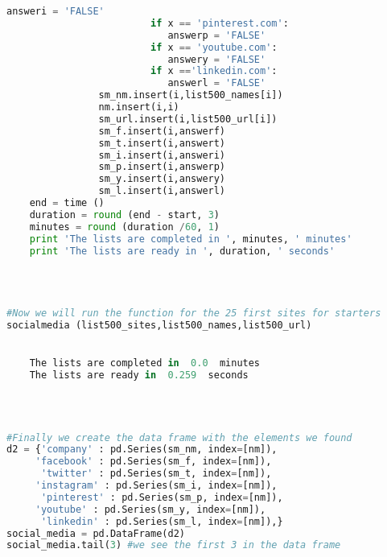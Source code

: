\documentclass{article}
\begin{document}
\begin{lstlisting}[language=Python]
                            answeri = 'FALSE'
                         if x == 'pinterest.com':
                            answerp = 'FALSE'
                         if x == 'youtube.com':
                            answery = 'FALSE'
                         if x =='linkedin.com':
                            answerl = 'FALSE'                
                sm_nm.insert(i,list500_names[i]) 
                nm.insert(i,i)
                sm_url.insert(i,list500_url[i])
                sm_f.insert(i,answerf)
                sm_t.insert(i,answert)
                sm_i.insert(i,answeri)
                sm_p.insert(i,answerp)
                sm_y.insert(i,answery)
                sm_l.insert(i,answerl)
    end = time ()
    duration = round (end - start, 3)
    minutes = round (duration /60, 1)
    print 'The lists are completed in ', minutes, ' minutes' 
    print 'The lists are ready in ', duration, ' seconds'
 


 
#Now we will run the function for the 25 first sites for starters
socialmedia (list500_sites,list500_names,list500_url)
 

    The lists are completed in  0.0  minutes
    The lists are ready in  0.259  seconds
    


 
#Finally we create the data frame with the elements we found            
d2 = {'company' : pd.Series(sm_nm, index=[nm]),
     'facebook' : pd.Series(sm_f, index=[nm]),
      'twitter' : pd.Series(sm_t, index=[nm]),
     'instagram' : pd.Series(sm_i, index=[nm]),
      'pinterest' : pd.Series(sm_p, index=[nm]),
     'youtube' : pd.Series(sm_y, index=[nm]),
      'linkedin' : pd.Series(sm_l, index=[nm]),}
social_media = pd.DataFrame(d2)    
social_media.tail(3) #we see the first 3 in the data frame
\end{lstlisting}
\end{document}
